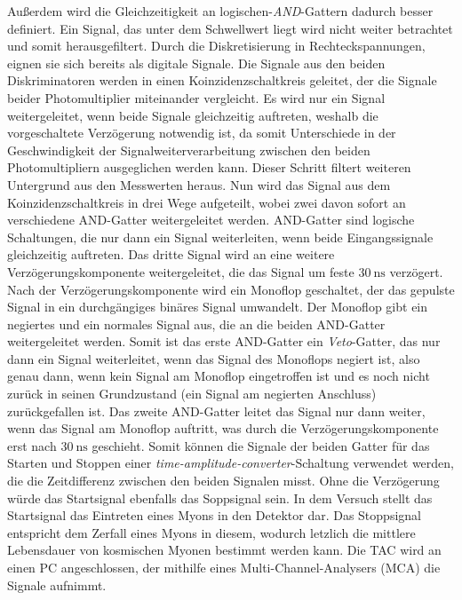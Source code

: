 Außerdem wird die Gleichzeitigkeit an logischen-\textit{AND}-Gattern dadurch besser definiert.
Ein Signal, das unter dem Schwellwert liegt wird nicht weiter betrachtet und somit herausgefiltert.
Durch die Diskretisierung in Rechteckspannungen, eignen sie sich bereits als digitale Signale.\newline
Die Signale aus den beiden Diskriminatoren werden in einen Koinzidenzschaltkreis geleitet, der die Signale beider Photomultiplier miteinander vergleicht.
Es wird nur ein Signal weitergeleitet, wenn beide Signale gleichzeitig auftreten, weshalb die vorgeschaltete Verzögerung notwendig ist, da somit Unterschiede in der Geschwindigkeit der Signalweiterverarbeitung zwischen den beiden Photomultipliern ausgeglichen werden kann.
Dieser Schritt filtert weiteren Untergrund aus den Messwerten heraus.\newline
Nun wird das Signal aus dem Koinzidenzschaltkreis in drei Wege aufgeteilt, wobei zwei davon sofort an verschiedene AND-Gatter weitergeleitet werden.
AND-Gatter sind logische Schaltungen, die nur dann ein Signal weiterleiten, wenn beide Eingangssignale gleichzeitig auftreten.
Das dritte Signal wird an eine weitere Verzögerungskomponente weitergeleitet, die das Signal um feste $\SI{30}{\nano\second}$ verzögert.
Nach der Verzögerungskomponente wird ein Monoflop geschaltet, der das gepulste Signal in ein durchgängiges binäres Signal umwandelt.
Der Monoflop gibt ein negiertes und ein normales Signal aus, die an die beiden AND-Gatter weitergeleitet werden.
Somit ist das erste AND-Gatter ein \textit{Veto}-Gatter, das nur dann ein Signal weiterleitet, wenn das Signal des Monoflops negiert ist, also genau dann, wenn kein Signal am Monoflop eingetroffen ist und es noch nicht zurück in seinen Grundzustand (ein Signal am negierten Anschluss) zurückgefallen ist.
Das zweite AND-Gatter leitet das Signal nur dann weiter, wenn das Signal am Monoflop auftritt, was durch die Verzögerungskomponente erst nach $\SI{30}{\nano\second}$ geschieht.
Somit können die Signale der beiden Gatter für das Starten und Stoppen einer \textit{time-amplitude-converter}-Schaltung verwendet werden, die die Zeitdifferenz zwischen den beiden Signalen misst.
Ohne die Verzögerung würde das Startsignal ebenfalls das Soppsignal sein.
In dem Versuch stellt das Startsignal das Eintreten eines Myons in den Detektor dar.
Das Stoppsignal entspricht dem Zerfall eines Myons in diesem, wodurch letzlich die mittlere Lebensdauer von kosmischen Myonen bestimmt werden kann. \newline
Die TAC wird an einen PC angeschlossen, der mithilfe eines Multi-Channel-Analysers (MCA) die Signale aufnimmt.
